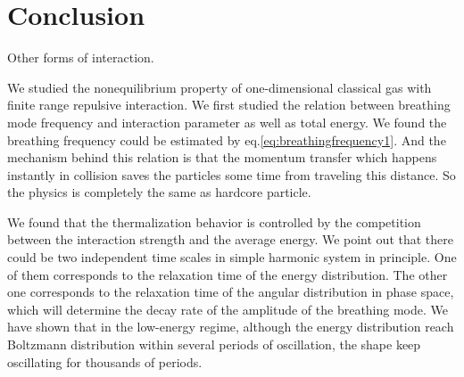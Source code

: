 \documentclass[onecolumn,pra]{revtex4-1}
\begin{document}
\section{Conclusion}

Other forms of interaction.

We studied the nonequilibrium property of one-dimensional classical gas with finite range repulsive
interaction. We first studied the relation between breathing mode frequency and interaction
parameter as well as total energy. We found the breathing frequency could be estimated by
eq.\ref{eq:breathingfrequency1}. And the mechanism behind this relation is that the momentum
transfer which happens instantly in collision saves the particles some time from traveling this
distance. So the physics is completely the same as hardcore particle.

We found that the thermalization behavior is controlled by the competition between the interaction
strength and the average energy. We point out that there could be two independent time scales in
simple harmonic system in principle. One of them corresponds to the relaxation time of the energy
distribution. The other one corresponds to the relaxation time of the angular distribution in phase
space, which will determine the decay rate of the amplitude of the breathing mode. We have shown
that in the low-energy regime, although the energy distribution reach Boltzmann distribution within
several periods of oscillation, the shape keep oscillating for thousands of periods.




\end{document}
